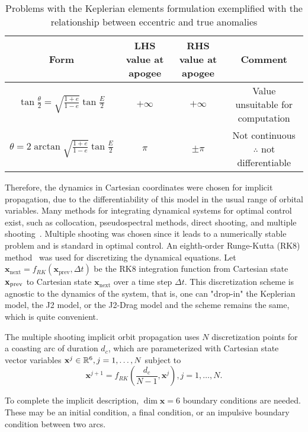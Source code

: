 \begin{table}[htbp]
    \centering
    \begin{tabular}{cccc} \toprule
        Form & LHS value at apogee & RHS value at apogee & Comment  \\ \midrule
        \(\tan{\frac{\theta}{2}} = \sqrt{\frac{1+e}{1-e}} \tan{\frac{E}{2}}\) & \(+\infty\) & \(+\infty\) & \parbox{2.5cm}{Value unsuitable for computation} \\
        \(\theta = 2\arctan{\sqrt{\frac{1+e}{1-e}} \tan{\frac{E}{2}}}\) & \(\pi\) & \(\pm\pi\) & \parbox{2.5cm}{Not continuous \(\therefore\) not differentiable} \\ \bottomrule
    \end{tabular}
    \caption{Problems with the Keplerian elements formulation exemplified with the relationship between eccentric and true anomalies}
    \label{tab:kep_ecc_true}
\end{table}

Therefore, the dynamics in Cartesian coordinates were chosen for implicit propagation, due to the differentiability of this model in the usual range of orbital variables. Many methods for integrating dynamical systems for optimal control exist, such as collocation, pseudospectral methods, direct shooting, and multiple shooting~\cite{numerical_recipes}. Multiple shooting was chosen since it leads to a numerically stable problem and is standard in optimal control. An eighth-order Runge-Kutta (RK8) method~\cite{rk8} was used for discretizing the dynamical equations. Let  \(\mathbf{x}_{\text{next}} = f_{RK}(\mathbf{x}_{\text{prev}}, \Delta t)\) be the RK8 integration function from Cartesian state \(\mathbf{x}_{\text{prev}}\) to Cartesian state \(\mathbf{x}_{\text{next}}\) over a time step \(\Delta t\). This discretization scheme is agnostic to the dynamics of the system, that is, one can "drop-in" the Keplerian model, the J2 model, or the J2-Drag model and the scheme remains the same, which is quite convenient.

The multiple shooting implicit orbit propagation uses \(N\) discretization points for a coasting arc of duration \(d_c\), which are parameterized with Cartesian state vector variables \(\mathbf{x}^j \in \mathbb{R}^6, j=1,\dots,N\) subject to 
\begin{equation}
    \mathbf{x}^{j+1} = f_{RK}(\frac{d_c}{N - 1}, \mathbf{x}^j), j = 1, \dots, N.
\end{equation}

To complete the implicit description, \(\dim \mathbf{x} = 6\) boundary conditions are needed. These may be an initial condition, a final condition, or an impulsive boundary condition between two arcs.

